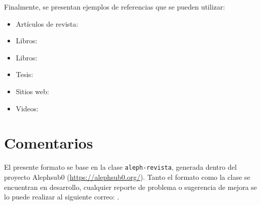 \documentclass{aleph-revista}
\begin{document}
Finalmente, se presentan ejemplos de referencias que se pueden utilizar:
\begin{itemize}
    \item Artículos de revista: \cite{Bib01}
    \item Libros: \cite{Bib02}
    \item Libros: \cite{Bib06}
    \item Tesis: \cite{Bib03}
    \item Sitios web: \cite{Bib04}
    \item Videos: \cite{Bib05}
\end{itemize}

\section{Comentarios}

El presente formato se base en la clase \texttt{aleph-revista}, generada dentro del proyecto Alephsub0 (\url{https://alephsub0.org/}). Tanto el formato como la clase se encuentran en desarrollo, cualquier reporte de problema o sugerencia de mejora se lo puede realizar al siguiente correo: 
.


\printbibliography
\end{document}
